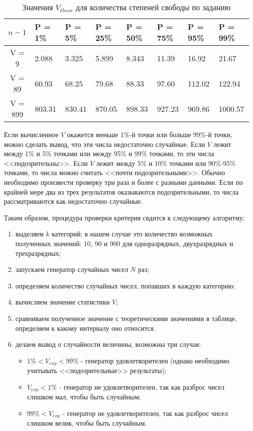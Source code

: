 \begin{table}[h!]
	\centering
	\caption{Значения $V_{theor}$ для количества степеней свободы по заданию}
	\begin{tabular}{| c | p{1.5cm} | p{1.5cm} | p{1.5cm} | p{1.5cm} | p{1.5cm} | p{1.5cm} | p{2cm} |} 
		\hline
		$n - 1$ & P = 1\% &  P = 5\% &  P = 25\% &  P = 50\% &  P = 75\% &  P = 95\% &  P = 99\% \\ [0.5ex] 
		\hline
		V = 9 & 2.088 & 3.325 & 5.899 & 8.343 & 11.39 & 16.92 & 21.67 \\ [0.5ex] 
		\hline
		V = 89 & 60.93 & 68.25 & 79.68 & 88.33 & 97.60 & 112.02 & 122.94 \\ [0.5ex] 
		\hline
		V = 899 & 803.31 & 830.41 & 870.05 & 898.33 & 927.23 & 969.86 & 1000.57 \\ [0.5ex]  
		\hline
	\end{tabular}
\end{table}


Если вычисленное $V$ окажется меньше 1\%-й точки или больше 99\%-й точки, можно сделать
вывод, что эти числа недостаточно случайные. Если $V$ лежит между 1\% и 5\% точками или
между 95\% и 99\% точками, то эти числа <<подозрительны>>. Если $V$ лежит между 5\% и 10\%
точками или 90\%-95\% точками, то числа можно считать <<почти подозрительными>>. Обычно
необходимо произвести проверку три раза и более с разными данными. Если по крайней мере
два из трех результатов оказываются подозрительными, то числа рассматриваются как
недостаточно случайные.


Таким образом, процедура проверки критерия свдится к следующему алгоритму:
\begin{enumerate}
	\item выделяем $k$ категорий; в нашем случае это количество возможных полученных
	значений: 10, 90 и 900 для одноразрядных, двухразрядных и трехразрядных;
	\item запускаем генератор случайных чисел $N$ раз;
	\item определяем количество случайных чисел, попавших в каждую категорию;
	\item вычисляем значение статистики $V$;
	\item сравниваем полученное значение с теоретическими значениями в таблице, определяем к какому интервалу оно относится.
	\item делаем вывод о случайности величины, возможны три случая:
	\begin{itemize}
		\item $1\% < V_{exp} < 99\%$ - генератор удовлетворителен (однако необходимо учитывать <<подозрительные>> результаты);
		\item $V_{exp} < 1\%$ - генератор не удовлетворителен, так как разброс
		чисел слишком мал, чтобы быть случайным;
		\item $ 99\% < V_{exp}$ - генератор не удовлетворителен, так как разброс
		чисел слишком велик, чтобы быть случайным.
	\end{itemize}
\end{enumerate}





